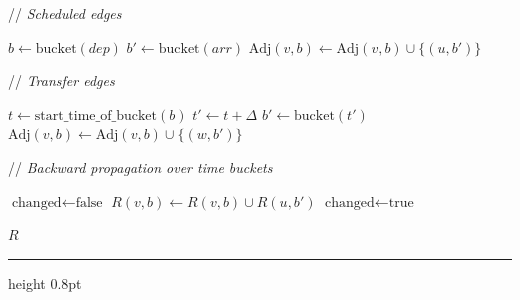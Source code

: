 \documentclass{article}
\newcommand{\CommentLine}[1]{
    \State // \textit{#1}
}
\begin{document}
\begin{algorithmic}[1]
    \vspace{0.5em}
    \CommentLine{Scheduled edges}
        \State $b \leftarrow \text{bucket}(dep)$
        \State $b' \leftarrow \text{bucket}(arr)$
            \State $\text{Adj}(v,b) \leftarrow \text{Adj}(v,b) \cup \{(u,b')\}$
        \EndIf
    \EndFor

    \vspace{0.5em}
    \CommentLine{Transfer edges}
            \State $t \leftarrow \text{start\_time\_of\_bucket}(b)$
            \State $t' \leftarrow t + \Delta$
            \State $b' \leftarrow \text{bucket}(t')$
                \State $\text{Adj}(v,b) \leftarrow \text{Adj}(v,b) \cup \{(w,b')\}$
            \EndIf
        \EndFor
    \EndFor

    \vspace{0.5em}
    \CommentLine{Backward propagation over time buckets}
        \Repeat
            \State $\text{changed} \leftarrow \text{false}$
                        \State $R(v,b) \leftarrow R(v,b) \cup R(u,b')$
                        \State $\text{changed} \leftarrow \text{true}$
                    \EndIf
                \EndFor
            \EndFor
    \EndFor

    \State \Return $R$

\end{algorithmic}

\hrule height 0.8pt
\end{document}
